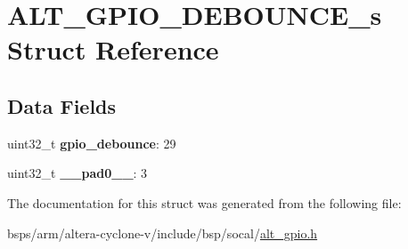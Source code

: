 \hypertarget{structALT__GPIO__DEBOUNCE__s}{}\section{A\+L\+T\+\_\+\+G\+P\+I\+O\+\_\+\+D\+E\+B\+O\+U\+N\+C\+E\+\_\+s Struct Reference}
\label{structALT__GPIO__DEBOUNCE__s}
\subsection*{Data Fields}
\begin{DoxyCompactItemize}
\item 
\mbox{\label{structALT__GPIO__DEBOUNCE__s_a6545ed24ae26362351a079a98dbc86a4}} 
uint32\+\_\+t {\bfseries gpio\+\_\+debounce}\+: 29
\item 
\mbox{\label{structALT__GPIO__DEBOUNCE__s_a3daca6af9b4f5490dbd42faff0d3d4c1}} 
uint32\+\_\+t {\bfseries \+\_\+\+\_\+pad0\+\_\+\+\_\+}\+: 3
\end{DoxyCompactItemize}


The documentation for this struct was generated from the following file\+:\begin{DoxyCompactItemize}
\item 
bsps/arm/altera-\/cyclone-\/v/include/bsp/socal/\mbox{\hyperlink{alt__gpio_8h}{alt\+\_\+gpio.\+h}}\end{DoxyCompactItemize}

